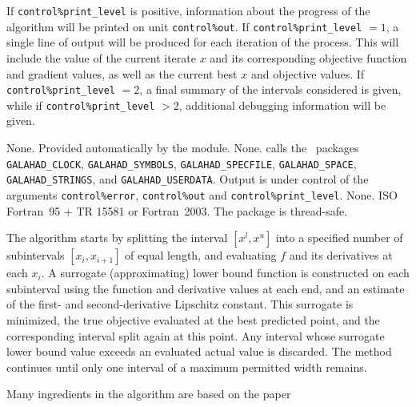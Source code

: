 \documentclass{galahad}
\newcommand{\packagename}{UGO}
\begin{document}

\galinfo
If {\tt control\%print\_level} is positive, information about the progress
of the algorithm will be printed on unit {\tt control\-\%out}.
If {\tt control\%print\_level} $= 1$, a single line of output will be produced
for each iteration of the process.
This will include the value of the current iterate $x$ and its corresponding
objective function  and gradient values, as well as the current best $x$ and
objective values.
If {\tt control\%print\_level} $=2$, a final summary of the intervals
considered is given, while if {\tt control\%print\_level} $>2$,
additional debugging information will be given.


\galgeneral

\galcommon None.
\galworkspace Provided automatically by the module.
\galroutines None.
\galmodules {\tt \packagename\_solve} calls the \galahad\ packages
{\tt GALAHAD\_CLOCK},
{\tt GALAHAD\_SY\-M\-BOLS},
{\tt GALAHAD\_SPECFILE},
{\tt GALAHAD\_SPACE},
{\tt GALAHAD\_STRINGS},
and
{\tt GALAHAD\_USERDATA}.
\galio Output is under control of the arguments
 {\tt control\%error}, {\tt control\%out} and {\tt control\%print\_level}.
\galrestrictions None.
\galportability ISO Fortran~95 + TR 15581 or Fortran~2003.
The package is thread-safe.


\galmethod

The algorithm starts by splitting the interval $[x^l,x^u]$ into a specified
number of subintervals $[x_i,x_{i+1}]$ of equal length, and evaluating
$f$ and its derivatives at each $x_i$. A surrogate (approximating)
lower bound function is constructed on each subinterval using the
function and derivative values at each end, and an estimate of the
first- and second-derivative Lipschitz constant. This surrogate is
minimized, the true objective evaluated at the best predicted point,
and the corresponding interval split again at this point.
Any interval whose surrogate lower bound value exceeds an evaluated
actual value is discarded. The method continues until only one interval
of a maximum permitted width remains.

\galreferences
\vspace*{1mm}

\noindent
 Many ingredients in the algorithm are based on the paper
\vspace*{1mm}
\end{document}
